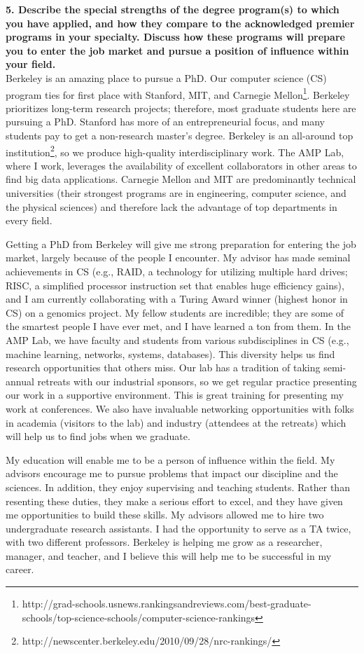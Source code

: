 \documentclass{article}
\begin{document}
\pagestyle{plain}

\noindent\textbf{5.  Describe the special strengths of the degree program(s) to which you have applied, and how they compare to the acknowledged premier programs in your specialty. Discuss how these programs will prepare you to enter the job market and pursue a position of influence within your field.}\\

Berkeley is an amazing place to pursue a PhD.
Our computer science (CS) program ties for first place with Stanford, MIT, and Carnegie Mellon\footnote{http://grad-schools.usnews.rankingsandreviews.com/best-graduate-schools/top-science-schools/computer-science-rankings}.  
Berkeley prioritizes long-term research projects; therefore, most graduate students here are pursuing a PhD.
Stanford has more of an entrepreneurial focus, and many students pay to get a non-research master's degree.
Berkeley is an all-around top institution\footnote{http://newscenter.berkeley.edu/2010/09/28/nrc-rankings/}, so we produce high-quality interdisciplinary work.
The AMP Lab, where I work, leverages the availability of excellent collaborators in other areas to find big data applications.
Carnegie Mellon and MIT are predominantly technical universities (their strongest programs are in engineering, computer science, and the physical sciences) and therefore lack the advantage of top departments in every field.

Getting a PhD from Berkeley will give me strong preparation for entering the job market, largely because of the people I encounter.
My advisor has made seminal achievements in CS (e.g., RAID, a technology for utilizing multiple hard drives; RISC, a simplified processor instruction set that enables huge efficiency gains), and I am currently collaborating with a Turing Award winner (highest honor in CS) on a genomics project.
My fellow students are incredible; they are some of the smartest people I have ever met, and I have learned a ton from them.
In the AMP Lab, we have faculty and students from various subdisciplines in CS (e.g., machine learning, networks, systems, databases).
This diversity helps us find research opportunities that others miss.
Our lab has a tradition of taking semi-annual retreats with our industrial sponsors, so we get regular practice presenting our work in a supportive environment.
This is great training for presenting my work at conferences.
We also have invaluable networking opportunities with folks in academia (visitors to the lab) and industry (attendees at the retreats) which will help us to find jobs when we graduate.

My education will enable me to be a person of influence within the field.
My advisors encourage me to pursue problems that impact our discipline and the sciences.
In addition, they enjoy supervising and teaching students.
Rather than resenting these duties, they make a serious effort to excel, and they have given me opportunities to build these skills.
My advisors allowed me to hire two undergraduate research assistants.
I had the opportunity to serve as a TA twice, with two different professors.
Berkeley is helping me grow as a researcher, manager, and teacher, and I believe this will help me to be successful in my career.
\end{document}
